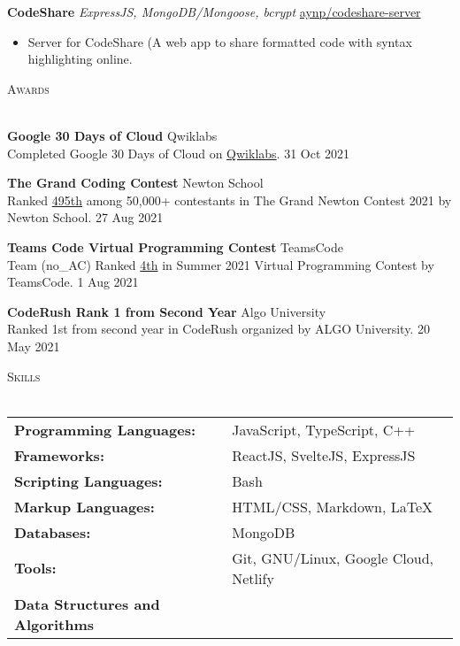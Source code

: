 \documentclass[a4paper]{article}
\newcommand{\lineunder} {
    \vspace*{-8pt} \\
    \hspace*{-18pt} \hrulefill \\
}
\newcommand{\header} [1] {
    {\hspace*{-18pt}\vspace*{6pt} \textsc{#1}}
    \vspace*{-6pt} \lineunder
}
\begin{document}
{\textbf{CodeShare}} {\sl ExpressJS, MongoDB/Mongoose, bcrypt} \hfill \href{https://github.com/aynp/codeshare-server}{aynp/codeshare-server}\\
\begin{itemize}
	\item Server for CodeShare (A web app to share formatted code with syntax highlighting online.
\end{itemize}
\vspace*{1.5mm}



\header{Awards}
\vspace{1mm}

\textbf{Google 30 Days of Cloud} \hfill Qwiklabs\\
Completed Google 30 Days of Cloud on \href{https://www.qwiklabs.com/public_profiles/4c78c6d8-ad43-4991-b8fe-03e559c1bac5}{Qwiklabs}. \hfill 31 Oct 2021\\
\vspace*{1mm}

\textbf{The Grand Coding Contest} \hfill Newton School\\
Ranked \href{https://www.linkedin.com/posts/aryanpathania03_aryan-has-secured-rank-495-in-newtons-grand-activity-6841777869484642304-YhKD}{495th} among 50,000+ contestants in The Grand Newton Contest 2021 by Newton School. \hfill 27 Aug 2021\\
\vspace*{1mm}

\textbf{Teams Code Virtual Programming Contest} \hfill TeamsCode\\
Team (no\_AC) Ranked \href{https://youtu.be/eCylTCHctY0?t=16137}{4th} in Summer 2021 Virtual Programming Contest by TeamsCode. \hfill 1 Aug 2021\\
\vspace*{1mm}

\textbf{CodeRush Rank 1 from Second Year} \hfill Algo University\\
Ranked 1st from second year in CodeRush organized by ALGO University. \hfill 20 May 2021\\
\vspace*{1.5mm}




\header{Skills}
\vspace{1mm}
\begin{tabular}{ l l }
	\textbf{Programming Languages:} & JavaScript, TypeScript, C++ \\
	\textbf{Frameworks:} & ReactJS, SvelteJS, ExpressJS \\
	\textbf{Scripting Languages:} & Bash \\
	\textbf{Markup Languages:} & HTML/CSS, Markdown, \LaTeX \\
	\textbf{Databases:} &MongoDB \\
	\textbf{Tools:} & Git, GNU/Linux, Google Cloud, Netlify \\
	\textbf{Data Structures and Algorithms} \\
\end{tabular}
\vspace{1.5mm}
\end{document}
